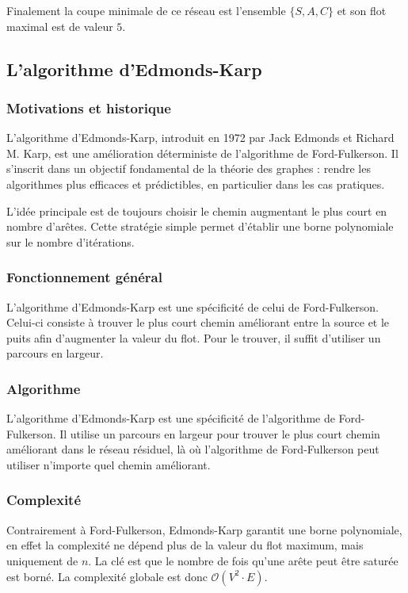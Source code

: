 \documentclass[a4paper]{article}
\begin{document}
Finalement la coupe minimale de ce réseau est l'ensemble $\{S,A,C\}$ et son flot maximal est de valeur $5$.
\subsection{L'algorithme d'Edmonds-Karp}

\subsubsection{Motivations et historique}

L’algorithme d’Edmonds-Karp, introduit en 1972 par Jack Edmonds et Richard M. Karp, est une amélioration déterministe de l’algorithme de Ford-Fulkerson. Il s’inscrit dans un objectif fondamental de la théorie des graphes : rendre les algorithmes plus efficaces et prédictibles, en particulier dans les cas pratiques\cite{10.1145/321694.321699}.

L’idée principale est de toujours choisir le chemin augmentant le plus court en nombre d’arêtes. Cette stratégie simple permet d’établir une borne polynomiale sur le nombre d’itérations.
\subsubsection{Fonctionnement général}
L'algorithme d'Edmonds-Karp est une spécificité de celui de Ford-Fulkerson. Celui-ci consiste à trouver le plus court chemin améliorant entre la source et le puits afin d'augmenter la valeur du flot. Pour le trouver, il suffit d'utiliser un parcours en largeur.
\subsubsection{Algorithme}
L'algorithme d'Edmonds-Karp est une spécificité de l'algorithme de Ford-Fulkerson. Il utilise un parcours en largeur pour trouver le plus court chemin améliorant dans le réseau résiduel, là où l'algorithme de Ford-Fulkerson peut utiliser n'importe quel chemin améliorant.
\subsubsection{Complexité}
Contrairement à Ford-Fulkerson, Edmonds-Karp garantit une borne polynomiale, en effet la complexité ne dépend plus de la valeur du flot maximum, mais uniquement de $n$. La clé est que le nombre de fois qu’une arête peut être saturée est borné.
La complexité globale est donc $\mathcal{O}(V^2 \cdot E)$.
\end{document}
